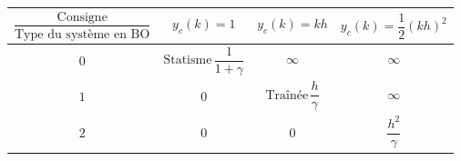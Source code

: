 \documentclass[11pt]{article}
\begin{document}
    \begin{longtable}[]{@{}cccc@{}}
\toprule
\begin{minipage}[b]{0.3\columnwidth}\centering\strut
\[ \frac{\text{Consigne}}{\text{Type du système en BO}} \]\strut
\end{minipage} & \begin{minipage}[b]{0.15\columnwidth}\centering\strut
\[ y_c(k) = 1 \]\strut
\end{minipage} & \begin{minipage}[b]{0.15\columnwidth}\centering\strut
\[ y_c(k) = kh \]\strut
\end{minipage} & \begin{minipage}[b]{0.15\columnwidth}\centering\strut
\[ y_c(k) = \frac{1}{2}(kh)^2 \]\strut
\end{minipage}\tabularnewline
\midrule
\endhead
\begin{minipage}[t]{0.3\columnwidth}\centering\strut
\[ 0 \]\strut
\end{minipage} & \begin{minipage}[t]{0.15\columnwidth}\centering\strut
\[ \text{Statisme}\, \frac{1}{1+\gamma} \]\strut
\end{minipage} & \begin{minipage}[t]{0.15\columnwidth}\centering\strut
\[ \infty \]\strut
\end{minipage} & \begin{minipage}[t]{0.15\columnwidth}\centering\strut
\[ \infty \]\strut
\end{minipage}\tabularnewline
\begin{minipage}[t]{0.3\columnwidth}\centering\strut
\[ 1 \]\strut
\end{minipage} & \begin{minipage}[t]{0.15\columnwidth}\centering\strut
\[ 0 \]\strut
\end{minipage} & \begin{minipage}[t]{0.15\columnwidth}\centering\strut
\[ \text{Traînée}\, \frac{h}{\gamma} \]\strut
\end{minipage} & \begin{minipage}[t]{0.15\columnwidth}\centering\strut
\[ \infty \]\strut
\end{minipage}\tabularnewline
\begin{minipage}[t]{0.3\columnwidth}\centering\strut
\[ 2 \]\strut
\end{minipage} & \begin{minipage}[t]{0.15\columnwidth}\centering\strut
\[ 0 \]\strut
\end{minipage} & \begin{minipage}[t]{0.15\columnwidth}\centering\strut
\[ 0 \]\strut
\end{minipage} & \begin{minipage}[t]{0.15\columnwidth}\centering\strut
\[ \frac{h^2}{\gamma} \]\strut
\end{minipage}\tabularnewline
\bottomrule
\end{longtable}
\end{document}
